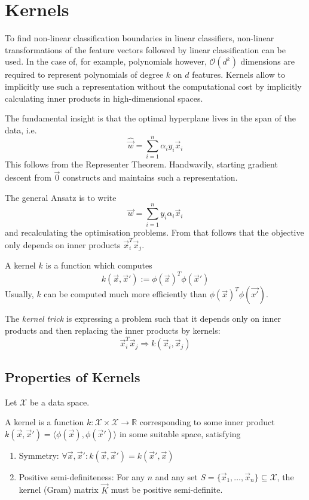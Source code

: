 \section{Kernels}
To find non-linear classification boundaries in linear
classifiers, non-linear transformations of the feature vectors
followed by linear classification can be used.
In the case of, for example, polynomials however,
$\mathcal{O}(d^k)$ dimensions are required to represent
polynomials of degree $k$ on $d$ features.
Kernels allow to implicitly use such a representation
without the computational cost by implicitly calculating
inner products in high-dimensional spaces.

The fundamental insight is that the optimal hyperplane
lives in the span of the data, i.e.
\begin{equation*}
    \hat{\vec{w}} = \sum_{i=1}^n{\alpha_i y_i \vec{x}_i}
\end{equation*}
This follows from the Representer Theorem.
Handwavily, starting gradient descent from $\vec{0}$
constructs and maintains such a representation.

The general Ansatz is to write
\begin{equation*}
    \vec{w} = \sum_{i=1}^n{y_i \alpha_i \vec{x}_i}
\end{equation*}
and recalculating the optimisation problems.
From that follows that the objective only depends
on inner products $\vec{x}_i^T \vec{x}_j$.

A kernel $k$ is a function which computes
\begin{equation*}
    k(\vec{x}, \vec{x}') :=
    \phi(\vec{x})^T \phi(\vec{x}')
\end{equation*}
Usually, $k$ can be computed much more efficiently than
$\phi(\vec{x})^T \phi(\vec{x'})$.

The \emph{kernel trick} is expressing a problem such that
it depends only on inner products and then replacing the
inner products by kernels:
\begin{equation*}
    \vec{x}_i^T \vec{x}_j \Rightarrow k(\vec{x}_i, \vec{x}_j)
\end{equation*}


\subsection{Properties of Kernels}
Let $\mathcal{X}$ be a data space.

A kernel is a function
$k : \mathcal{X} \times \mathcal{X} \to \mathbb{R}$
corresponding to some inner product
$k(\vec{x}, \vec{x}') = \langle \phi(\vec{x}), \phi(\vec{x}') \rangle$
in some suitable space,
satisfying
\begin{enumerate}
    \item Symmetry:
    $\forall \vec{x}, \vec{x}': k(\vec{x}, \vec{x}') = k(\vec{x}', \vec{x})$
    \item Positive semi-definiteness:
    For any $n$ and any set $S = \{\vec{x}_1, \dotsc, \vec{x}_n\} \subseteq \mathcal{X}$,
    the kernel (Gram) matrix $\vec{K}$ must be positive
    semi-definite.
\end{enumerate}

